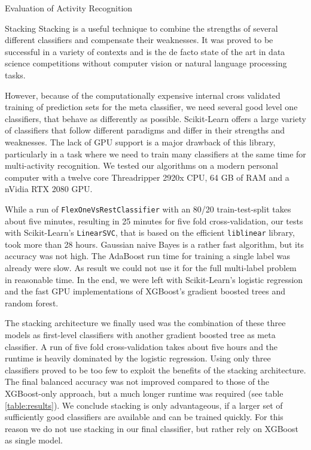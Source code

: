 \begin{section}{Evaluation of Activity Recognition}
	\begin{subsection}{Stacking}
		Stacking is a useful technique to combine the strengths of several different classifiers and compensate their weaknesses. It was proved to be successful in a variety of contexts and is the de facto state of the art in data science competitions without computer vision or natural language processing tasks.
		
		However, because of the computationally expensive internal cross validated training of prediction sets for the meta classifier, we need several good level one classifiers, that behave as differently as possible. Scikit-Learn offers a large variety of classifiers that follow different paradigms and differ in their strengths and weaknesses. The lack of GPU support is a major drawback of this library, particularly in a task where we need to train many classifiers at the same time for multi-activity recognition. We tested our algorithms on a modern personal computer with a twelve core Threadripper 2920x CPU, 64 GB of RAM and a nVidia RTX 2080 GPU.
		
		While a run of \texttt{FlexOneVsRestClassifier} with an 80/20 train-test-split takes about five minutes, resulting in 25 minutes for five fold  cross-validation, our tests with Scikit-Learn's \texttt{LinearSVC}, that is based on the efficient \texttt{liblinear} library, took more than 28 hours. Gaussian naive Bayes is a rather fast algorithm, but its accuracy was not high. The AdaBoost run time for training a single label was already were slow. As result we could not use it for the full multi-label problem in reasonable time. In the end, we were left with Scikit-Learn's logistic regression and the fast GPU implementations of XGBoost's gradient boosted trees and random forest.
		
		The stacking architecture we finally used was the combination of these three models as first-level classifiers with another gradient boosted tree as meta classifier. A run of five fold cross-validation takes about five hours and the runtime is heavily dominated by the logistic regression. Using only three classifiers proved to be too few to exploit the benefits of the stacking architecture. The final balanced accuracy was not improved compared to those of the XGBoost-only approach, but a much longer runtime was required (see table \ref{table:results}). We conclude stacking is only advantageous, if a larger set of sufficiently good classifiers are available and can be trained quickly. For this reason we do not use stacking in our final classifier, but rather rely on XGBoost as single model.
	\end{subsection}


\end{section}
